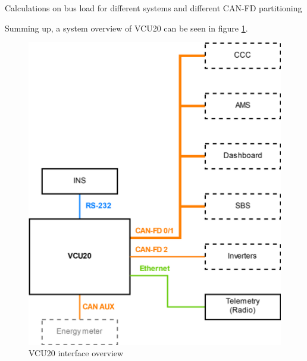 {\color{red}Calculations on bus load for different systems and different CAN-FD partitioning}

Summing up, a system overview of VCU20 can be seen in figure \ref{fig:vcu20_system}.

\begin{figure}[h!]
    \centering
    \includegraphics[width=.65\textwidth]{media/vcu20_system.png}
    \caption{VCU20 interface overview}
    \label{fig:vcu20_system}
\end{figure}






